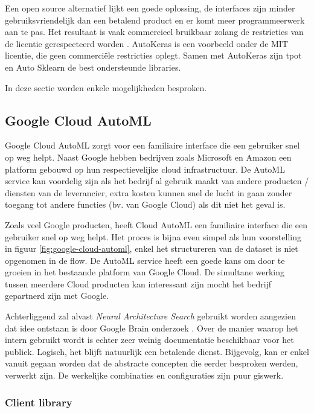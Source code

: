 Een open source alternatief lijkt een goede oplossing, de interfaces zijn minder gebruiksvriendelijk dan een betalend product en er komt meer programmeerwerk aan te pas. Het resultaat is vaak commercieel bruikbaar zolang de restricties van de licentie gerespecteerd worden \autocite{Balter2015}. AutoKeras is een voorbeeld onder de MIT licentie, die geen commerciële restricties oplegt. Samen met AutoKeras zijn tpot en Auto Sklearn de best ondersteunde libraries.

In deze sectie worden enkele mogelijkheden besproken.

\subsection{Google Cloud AutoML}
\label{subsec:google-automl}

Google Cloud AutoML zorgt voor een familiaire interface die een gebruiker snel op weg helpt. Naast Google hebben bedrijven zoals Microsoft en Amazon een platform gebouwd op hun respectievelijke cloud infrastructuur. De AutoML service kan voordelig zijn als het bedrijf al gebruik maakt van andere producten / diensten van de leverancier, extra kosten kunnen snel de lucht in gaan zonder toegang tot andere functies (bv. van Google Cloud) als dit niet het geval is. 

Zoals veel Google producten, heeft Cloud AutoML een familiaire interface die een gebruiker snel op weg helpt. Het proces is bijna even simpel als hun voorstelling in figuur \ref{fig:google-cloud-automl}, enkel het structureren van de dataset is niet opgenomen in de flow. De AutoML service heeft een goede kans om door te groeien in het bestaande platform van Google Cloud. De simultane werking tussen meerdere Cloud producten kan interessant zijn mocht het bedrijf gepartnerd zijn met Google.

Achterliggend zal alvast \textit{Neural Architecture Search} gebruikt worden aangezien dat idee ontstaan is door Google Brain onderzoek \autocite{ZophL2016}. Over de manier waarop het intern gebruikt wordt is echter zeer weinig documentatie beschikbaar voor het publiek. Logisch, het blijft natuurlijk een betalende dienst. Bijgevolg, kan er enkel vanuit gegaan worden dat de abstracte concepten die eerder besproken werden, verwerkt zijn. De werkelijke combinaties en configuraties zijn puur giswerk. 

\subsubsection{Client library}
\label{subsubsec:client-library}

